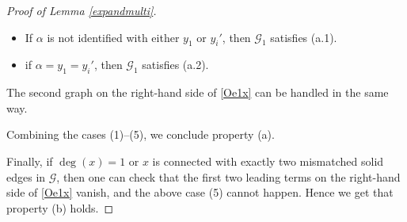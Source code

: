 \documentclass{article}
\newcommand{\1}{\mathds{1}}
\numberwithin{equation}{section}
\newcommand{\al}{\alpha}
\renewcommand{\cal}{\mathcal}
\theoremstyle{plain} %
\theoremstyle{remark}
\begin{document}
\begin{proof} [Proof of Lemma \ref{expandmulti}]
\begin{itemize}
\begin{itemize}
\item If $\al$ is not identified with either $y_1$ or $y_i'$, then $\cal G_1$ satisfies (a.1). 

\item if $\al=y_1=y_i'$, then $\cal G_1$ satisfies (a.2). 
\end{itemize}
The second graph on the right-hand side of \eqref{Oe1x} can be handled in the same way. 
\end{itemize}
Combining the cases (1)--(5), we conclude property (a). 

Finally, if $\deg(x)=1$ or $x$ is connected with exactly two mismatched solid edges in $\cal G$, then one can check that the first two leading terms on the right-hand side of \eqref{Oe1x} vanish, and the above case (5) cannot happen. Hence we get that property (b) holds. %
  \end{proof} 

\end{document}
